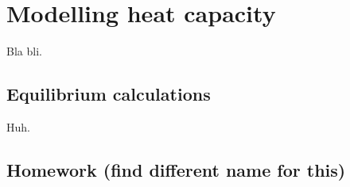 \chapter{Modelling heat capacity} \label{chp:models}
    Bla bli.

    \section{Equilibrium calculations} \label{sec:equilibrium calcs}
        Huh.

    \section{Homework (find different name for this)}
